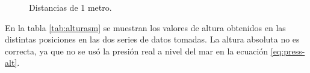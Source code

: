 \documentclass[main]{subfiles}
\begin{document}
\begin{figure}[H]
\hspace{-40pt}
\centering
  \caption{Distancias de 1 metro.}
\label{fig:1m}
\end{figure}

En la tabla \ref{tab:alturasm} se muestran los valores de altura obtenidos en las distintas posiciones en las dos series de datos tomadas. La altura absoluta no es correcta, ya que no se usó la presión real a nivel del mar en la ecuación \ref{eq:press-alt}.
\end{document}
